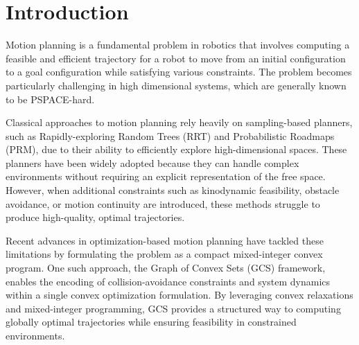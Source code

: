 \section{Introduction}

Motion planning is a fundamental problem in robotics that involves computing a feasible and efficient trajectory for a robot to move from an initial configuration to a goal configuration while satisfying various constraints\cite{lavalle2006planning}.
%
The problem becomes particularly challenging in high dimensional systems, which are generally known to be PSPACE-hard\cite{reif1979complexity}.

Classical approaches to motion planning rely heavily on sampling-based planners, such as Rapidly-exploring Random Trees (RRT)\cite{lavalle2001randomized} and Probabilistic Roadmaps (PRM)\cite{kavraki1996probabilistic}, due to their ability to efficiently explore high-dimensional spaces.
%
These planners have been widely adopted because they can handle complex environments without requiring an explicit representation of the free space.
%
However, when additional constraints such as kinodynamic feasibility, obstacle avoidance, or motion continuity are introduced, these methods struggle to produce high-quality, optimal trajectories.

Recent advances in optimization-based motion planning have tackled these limitations by formulating the problem as a compact mixed-integer convex program\cite{marcucci2023motion}.
%
One such approach, the Graph of Convex Sets (GCS) framework\cite{marcucci2024shortest}, enables the encoding of collision-avoidance constraints and system dynamics within a single convex optimization formulation.
%
By leveraging convex relaxations and mixed-integer programming, GCS provides a structured way to computing globally optimal trajectories while ensuring feasibility in constrained environments.

